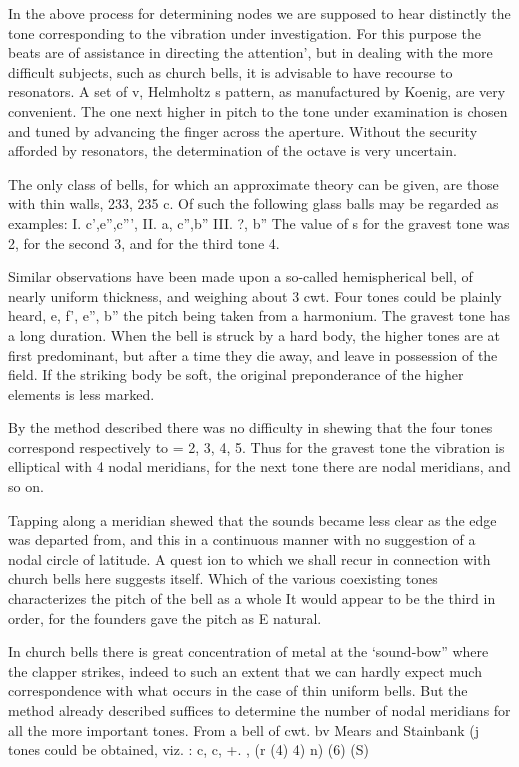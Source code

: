 In the above process for determining nodes we are supposed to hear distinctly
the tone corresponding to the vibration under investigation. For this purpose
the beats are of assistance in directing the attention', but in dealing with
the more difficult subjects, such as church bells, it is advisable to have
recourse to resonators. A set of v, Helmholtz s pattern, as manufactured by
Koenig, are very convenient. The one next higher in pitch to the tone under
examination is chosen and tuned by advancing the finger across the aperture.
Without the security afforded by resonators, the determination of the octave is
very uncertain.

The only class of bells, for which an approximate theory can be given, are
those with thin walls, 233, 235 c. Of such the following glass balls may be
regarded as examples:
I. c',e'',c''', II. a, c'',b''  III. ?, b''
The value of s for the gravest tone was 2, for the second 3, and for the third
tone 4.

Similar observations have been made upon a so-called hemispherical bell, of
nearly uniform thickness, and weighing about 3 cwt.
 Four tones could be plainly
heard,
 e, f', e'', b''
the pitch being taken from a harmonium. The gravest tone has a long duration.
When the bell is struck by a hard body, the higher tones are at first
predominant, but after a time they die away, and leave in possession of the
field. If the striking body be soft, the original preponderance of the higher
elements is less marked.

By the method described there was no difficulty in shewing that the four tones
correspond respectively to = 2, 3, 4, 5. Thus for the gravest tone the
vibration is elliptical with 4 nodal meridians, for the next tone there are
nodal meridians, and so on.

Tapping along a meridian shewed that the sounds became less clear as the edge
was departed from, and this in a continuous manner with no suggestion of a
nodal circle of latitude. A quest ion to which we shall recur in connection
with church bells here suggests itself. Which of the various coexisting tones
characterizes the pitch of the bell as a whole  It would appear to be the third
in order, for the founders gave the pitch as E natural.

In church bells there is great concentration of metal at the ‘sound-bow” where
the clapper strikes, indeed to such an extent that we can hardly expect much
correspondence with what occurs in the case of thin uniform bells. But the
method already described suffices to determine the number of nodal meridians
for all the more important tones. From a bell of cwt. bv Mears and Stainbank
(j tones could be obtained, viz. :
c, c, +. , (r (4) 4) n) (6) (S)

